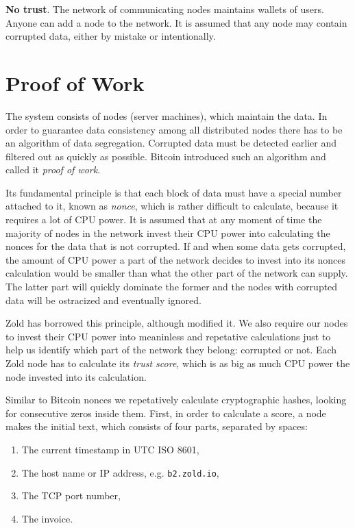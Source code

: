 \documentclass[11pt,oneside]{article}
\newcommand\dd[1]{\colorbox{gray!30}{\texttt{#1}}}
\begin{document}
\textbf{No trust}.
The network of communicating nodes maintains wallets of users.
Anyone can add a node to the network.
It is assumed that any node may contain corrupted data, either by mistake or intentionally.

\section{Proof of Work}

The system consists of nodes (server machines), which maintain the data.
In order to guarantee data consistency among all distributed nodes
there has to be an algorithm of data segregation.
Corrupted data must be detected earlier and filtered out as quickly as possible.
Bitcoin introduced such an algorithm and called it \emph{proof of work}.

Its fundamental principle is that each block of data must have a special
number attached to it, known as \emph{nonce}, which is rather difficult to calculate,
because it requires a lot of CPU power. It is assumed that at any moment
of time the majority of nodes in the network invest their CPU power into
calculating the nonces for the data that is not corrupted. If and when
some data gets corrupted, the amount of CPU power a part of the network
decides to invest into its nonces calculation would be smaller than what
the other part of the network can supply. The latter part
will quickly dominate the former and the nodes with corrupted data will
be ostracized and eventually ignored.

Zold has borrowed this principle, although modified it. We also require
our nodes to invest their CPU power into meaninless and repetative
calculations just to help us identify which part of the network they belong:
corrupted or not. Each Zold node has to calculate its \emph{trust score},
which is as big as much CPU power the node invested into its calculation.

Similar to Bitcoin nonces we repetatively calculate cryptographic hashes,
looking for consecutive zeros inside them. First, in order to calculate a score,
a node makes the initial text, which consists of four parts,
separated by spaces:

\begin{enumerate}
\item The current timestamp in UTC ISO 8601,
\item The host name or IP address, e.g. \dd{b2.zold.io},
\item The TCP port number,
\item The invoice.
\end{enumerate}
\end{document}
